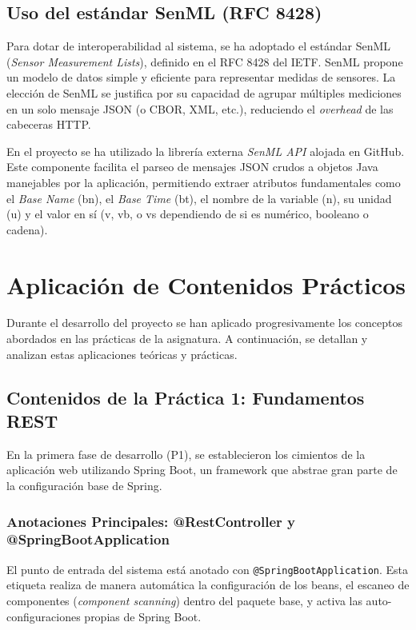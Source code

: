 \documentclass[12pt,a4paper]{article}
\begin{document}
\subsection{Uso del estándar SenML (RFC 8428)}
Para dotar de interoperabilidad al sistema, se ha adoptado el estándar SenML (\textit{Sensor Measurement Lists}), definido en el RFC 8428 del IETF. SenML propone un modelo de datos simple y eficiente para representar medidas de sensores. La elección de SenML se justifica por su capacidad de agrupar múltiples mediciones en un solo mensaje JSON (o CBOR, XML, etc.), reduciendo el \textit{overhead} de las cabeceras HTTP.

En el proyecto se ha utilizado la librería externa \textit{SenML API} alojada en GitHub. Este componente facilita el parseo de mensajes JSON crudos a objetos Java manejables por la aplicación, permitiendo extraer atributos fundamentales como el \textit{Base Name} (bn), el \textit{Base Time} (bt), el nombre de la variable (n), su unidad (u) y el valor en sí (v, vb, o vs dependiendo de si es numérico, booleano o cadena).

\newpage

\section{Aplicación de Contenidos Prácticos}

Durante el desarrollo del proyecto se han aplicado progresivamente los conceptos abordados en las prácticas de la asignatura. A continuación, se detallan y analizan estas aplicaciones teóricas y prácticas.

\subsection{Contenidos de la Práctica 1: Fundamentos REST}
En la primera fase de desarrollo (P1), se establecieron los cimientos de la aplicación web utilizando Spring Boot, un framework que abstrae gran parte de la configuración base de Spring.

\subsubsection{Anotaciones Principales: @RestController y @SpringBootApplication}
El punto de entrada del sistema está anotado con \texttt{@SpringBootApplication}. Esta etiqueta realiza de manera automática la configuración de los beans, el escaneo de componentes (\textit{component scanning}) dentro del paquete base, y activa las auto-configuraciones propias de Spring Boot.
\end{document}
